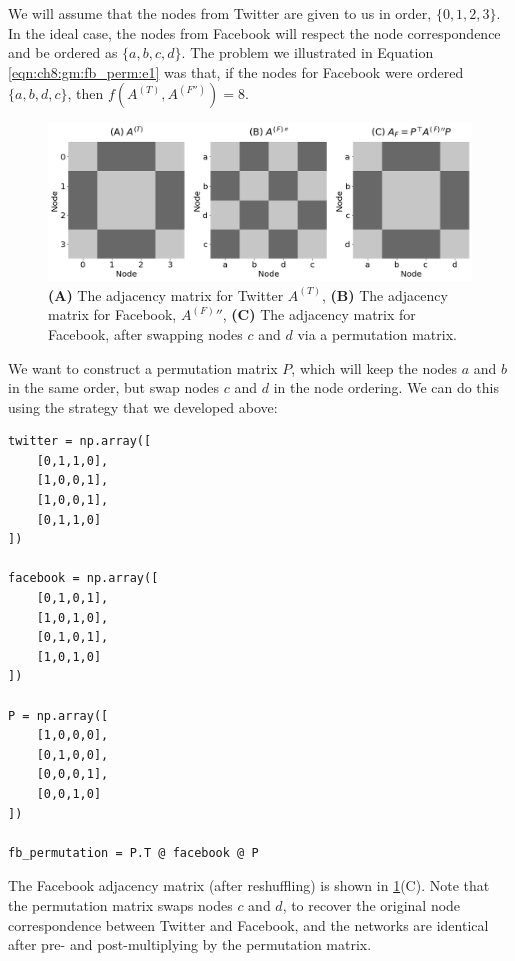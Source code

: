 We will assume that the nodes from Twitter are given to us in order, $\{0, 1, 2, 3\}$. In the ideal case, the nodes from Facebook will respect the node correspondence and be ordered as $\{a, b, c, d\}$. The problem we illustrated in Equation \eqref{eqn:ch8:gm:fb_perm:e1} was that, if the nodes for Facebook were ordered $\{a, b, d, c\}$, then $f\left(A^{(T)}, A^{(F'')}\right) = 8$.

\begin{figure}[h]
    \centering
    \includegraphics[width=\linewidth]{applications/ch8/Images/gm_fb_tw.png}
    \caption[Facebook and Twitter example, with permutations applied]{\textbf{(A)} The adjacency matrix for Twitter $A^{(T)}$, \textbf{(B)} The adjacency matrix for Facebook, $A^{(F)}''$, \textbf{(C)} The adjacency matrix for Facebook, after swapping nodes $c$ and $d$ via a permutation matrix.}
    \label{fig:ch8:gm:fb_tw}
\end{figure}

We want to construct a permutation matrix $P$, which will keep the nodes $a$ and $b$ in the same order, but swap nodes $c$ and $d$ in the node ordering. We can do this using the strategy that we developed above:

\begin{lstlisting}[style=python]
twitter = np.array([
    [0,1,1,0],
    [1,0,0,1],
    [1,0,0,1],
    [0,1,1,0]
])

facebook = np.array([
    [0,1,0,1],
    [1,0,1,0],
    [0,1,0,1],
    [1,0,1,0]
])

P = np.array([
    [1,0,0,0],
    [0,1,0,0],
    [0,0,0,1],
    [0,0,1,0]
])

fb_permutation = P.T @ facebook @ P
\end{lstlisting}
The Facebook adjacency matrix (after reshuffling) is shown in \ref{fig:ch8:gm:fb_tw}(C). Note that the permutation matrix swaps nodes $c$ and $d$, to recover the original node correspondence between Twitter and Facebook, and the networks are identical after pre- and post-multiplying by the permutation matrix.

